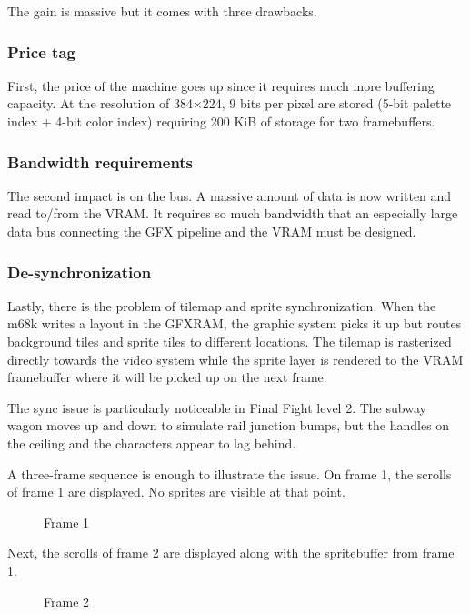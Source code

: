 The gain is massive but it comes with three drawbacks. 

\subsubsection{Price tag}
First, the price of the machine goes up since it requires much more buffering capacity. At the resolution of 384$\times$224, 9 bits per pixel are stored (5-bit palette index + 4-bit color index) requiring 200 KiB of storage for two framebuffers.

\subsubsection{Bandwidth requirements}
The second impact is on the bus. A massive amount of data is now written and read to/from the VRAM. It requires so much bandwidth that an especially large data bus connecting the GFX pipeline and the VRAM must be designed.

\subsubsection{De-synchronization}
Lastly, there is the problem of tilemap and sprite synchronization. When the m68k writes a layout in the GFXRAM, the graphic system picks it up but routes background tiles and sprite tiles to different locations. The tilemap is rasterized directly towards the video system while the sprite layer is rendered to the VRAM framebuffer where it will be picked up on the next frame.
 

\begin{trivia}
The sync issue is particularly noticeable in Final Fight level 2. The subway wagon moves up and down to simulate rail junction bumps, but the handles on the ceiling and the characters appear to lag behind.
\end{trivia}

A three-frame sequence is enough to illustrate the issue. On frame 1, the scrolls of frame 1 are displayed. No sprites are visible at that point.

\begin{figure}[H]
 \caption*{Frame 1}%
 \end{figure}%

Next, the scrolls of frame 2 are displayed along with the spritebuffer from frame 1.
 

\begin{figure}[H]
 \caption*{Frame 2}%
 \end{figure}%

